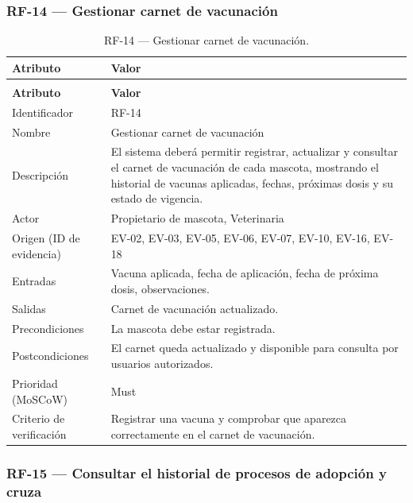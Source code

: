 \documentclass[journal,onecolumn]{IEEEtran}
\makeatletter
\newenvironment{atributos}[2]{%
	\small
	\begin{longtable}{@{}>{\raggedright\arraybackslash}p{4.2cm} >{\raggedright\arraybackslash}p{11.2cm}@{}}
		\caption{#2}\label{tab:#1}\\
		\toprule
		\textbf{Atributo} & \textbf{Valor} \\
		\midrule
		\endfirsthead
		\multicolumn{2}{@{}l}{\small\itshape (continuación)}\\
		\toprule
		\textbf{Atributo} & \textbf{Valor} \\
		\midrule
		\endhead
		\bottomrule
		\endlastfoot
	}{%
	\end{longtable}
	\normalsize
}
\makeatother
\begin{document}
	\subsubsection{RF-14 --- Gestionar carnet de vacunación}
	
	\begin{atributos}{RF-14}{RF-14 --- Gestionar carnet de vacunación.}
		Identificador & RF-14 \\
		Nombre & Gestionar carnet de vacunación \\
		Descripción & El sistema deberá permitir registrar, actualizar y consultar el carnet de vacunación de cada mascota, mostrando el historial de vacunas aplicadas, fechas, próximas dosis y su estado de vigencia. \\
		Actor & Propietario de mascota, Veterinaria \\
		Origen (ID de evidencia) & EV-02, EV-03, EV-05, EV-06, EV-07, EV-10, EV-16, EV-18 \\
		Entradas & Vacuna aplicada, fecha de aplicación, fecha de próxima dosis, observaciones. \\
		Salidas & Carnet de vacunación actualizado. \\
		Precondiciones & La mascota debe estar registrada. \\
		Postcondiciones & El carnet queda actualizado y disponible para consulta por usuarios autorizados. \\
		Prioridad (MoSCoW) & Must \\
		Criterio de verificación & Registrar una vacuna y comprobar que aparezca correctamente en el carnet de vacunación. \\
	\end{atributos}
	
	\subsubsection{RF-15 --- Consultar el historial de procesos de adopción y cruza}
	
\end{document}

